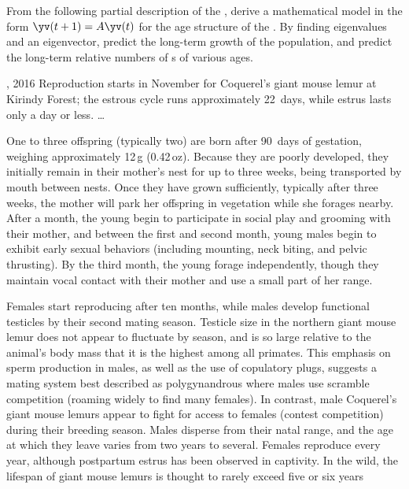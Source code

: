 \begin{exercise} \label{ex:} 
From the following partial description of the , 
derive a mathematical model in the form \(\yv(t+1)=A\yv(t)\) for the age structure of the .
By finding eigenvalues and an eigenvector, predict the long-term growth of the population, and predict the long-term relative numbers of s of various ages.
\begin{quoted}{, 2016}
Reproduction starts in November for Coquerel's giant mouse lemur at Kirindy Forest; the estrous cycle runs approximately 22~days, while estrus lasts only a day or less. \ldots

One to three offspring (typically two) are born after 90~days of gestation, weighing approximately 12\,g (0.42\,oz). Because they are poorly developed, they initially remain in their mother's nest for up to three weeks, being transported by mouth between nests. Once they have grown sufficiently, typically after three weeks, the mother will park her offspring in vegetation while she forages nearby. After a month, the young begin to participate in social play and grooming with their mother, and between the first and second month, young males begin to exhibit early sexual behaviors (including mounting, neck biting, and pelvic thrusting). By the third month, the young forage independently, though they maintain vocal contact with their mother and use a small part of her range.

Females start reproducing after ten months, while males develop functional testicles by their second mating season. Testicle size in the northern giant mouse lemur does not appear to fluctuate by season, and is so large relative to the animal's body mass that it is the highest among all primates. This emphasis on sperm production in males, as well as the use of copulatory plugs, suggests a mating system best described as polygynandrous where males use scramble competition (roaming widely to find many females). In contrast, male Coquerel's giant mouse lemurs appear to fight for access to females (contest competition) during their breeding season. Males disperse from their natal range, and the age at which they leave varies from two years to several. Females reproduce every year, although postpartum estrus has been observed in captivity. In the wild, the lifespan of giant mouse lemurs is thought to rarely exceed five or six years
\end{quoted}
\end{exercise}




